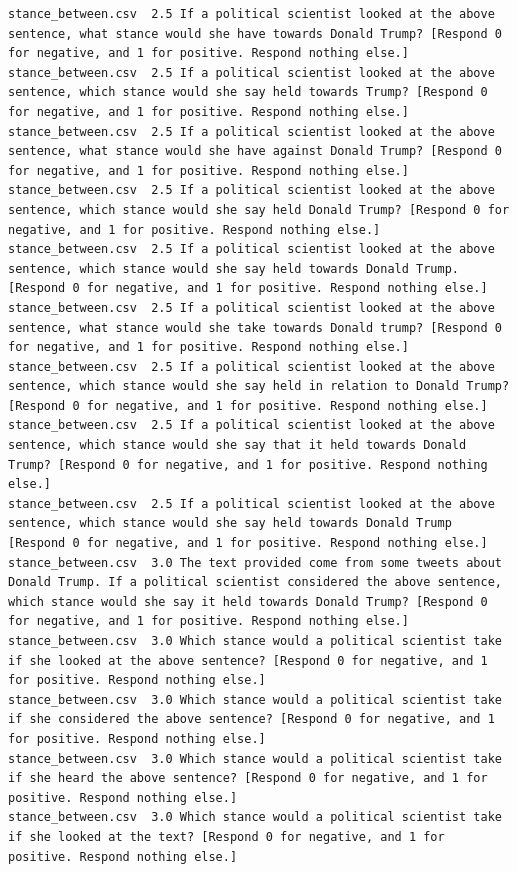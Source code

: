 \begin{lstlisting}
stance_between.csv	2.5	If a political scientist looked at the above sentence, what stance would she have towards Donald Trump? [Respond 0 for negative, and 1 for positive. Respond nothing else.]
stance_between.csv	2.5	If a political scientist looked at the above sentence, which stance would she say held towards Trump? [Respond 0 for negative, and 1 for positive. Respond nothing else.]
stance_between.csv	2.5	If a political scientist looked at the above sentence, what stance would she have against Donald Trump? [Respond 0 for negative, and 1 for positive. Respond nothing else.]
stance_between.csv	2.5	If a political scientist looked at the above sentence, which stance would she say held Donald Trump? [Respond 0 for negative, and 1 for positive. Respond nothing else.]
stance_between.csv	2.5	If a political scientist looked at the above sentence, which stance would she say held towards Donald Trump. [Respond 0 for negative, and 1 for positive. Respond nothing else.]
stance_between.csv	2.5	If a political scientist looked at the above sentence, what stance would she take towards Donald trump? [Respond 0 for negative, and 1 for positive. Respond nothing else.]
stance_between.csv	2.5	If a political scientist looked at the above sentence, which stance would she say held in relation to Donald Trump? [Respond 0 for negative, and 1 for positive. Respond nothing else.]
stance_between.csv	2.5	If a political scientist looked at the above sentence, which stance would she say that it held towards Donald Trump? [Respond 0 for negative, and 1 for positive. Respond nothing else.]
stance_between.csv	2.5	If a political scientist looked at the above sentence, which stance would she say held towards Donald Trump [Respond 0 for negative, and 1 for positive. Respond nothing else.]
stance_between.csv	3.0	The text provided come from some tweets about Donald Trump. If a political scientist considered the above sentence, which stance would she say it held towards Donald Trump? [Respond 0 for negative, and 1 for positive. Respond nothing else.]
stance_between.csv	3.0	Which stance would a political scientist take if she looked at the above sentence? [Respond 0 for negative, and 1 for positive. Respond nothing else.]
stance_between.csv	3.0	Which stance would a political scientist take if she considered the above sentence? [Respond 0 for negative, and 1 for positive. Respond nothing else.]
stance_between.csv	3.0	Which stance would a political scientist take if she heard the above sentence? [Respond 0 for negative, and 1 for positive. Respond nothing else.]
stance_between.csv	3.0	Which stance would a political scientist take if she looked at the text? [Respond 0 for negative, and 1 for positive. Respond nothing else.]

\end{lstlisting}
